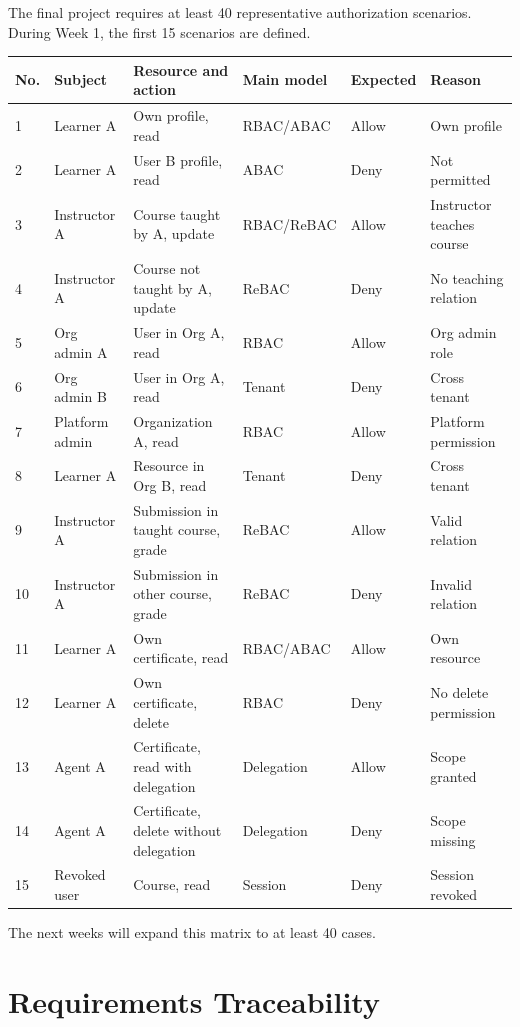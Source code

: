 \documentclass[11pt,a4paper]{article}
\begin{document}
The final project requires at least 40 representative authorization scenarios. During Week 1, the first 15 scenarios are defined.

\begin{longtable}{p{}p{}p{}p{}p{}p{}}
\toprule
No. & Subject & Resource and action & Main model & Expected & Reason \\
\midrule
1 & Learner A & Own profile, read & RBAC/ABAC & Allow & Own profile \\
2 & Learner A & User B profile, read & ABAC & Deny & Not permitted \\
3 & Instructor A & Course taught by A, update & RBAC/ReBAC & Allow & Instructor teaches course \\
4 & Instructor A & Course not taught by A, update & ReBAC & Deny & No teaching relation \\
5 & Org admin A & User in Org A, read & RBAC & Allow & Org admin role \\
6 & Org admin B & User in Org A, read & Tenant & Deny & Cross tenant \\
7 & Platform admin & Organization A, read & RBAC & Allow & Platform permission \\
8 & Learner A & Resource in Org B, read & Tenant & Deny & Cross tenant \\
9 & Instructor A & Submission in taught course, grade & ReBAC & Allow & Valid relation \\
10 & Instructor A & Submission in other course, grade & ReBAC & Deny & Invalid relation \\
11 & Learner A & Own certificate, read & RBAC/ABAC & Allow & Own resource \\
12 & Learner A & Own certificate, delete & RBAC & Deny & No delete permission \\
13 & Agent A & Certificate, read with delegation & Delegation & Allow & Scope granted \\
14 & Agent A & Certificate, delete without delegation & Delegation & Deny & Scope missing \\
15 & Revoked user & Course, read & Session & Deny & Session revoked \\
\bottomrule
\end{longtable}

The next weeks will expand this matrix to at least 40 cases.

\section{Requirements Traceability}
\end{document}
